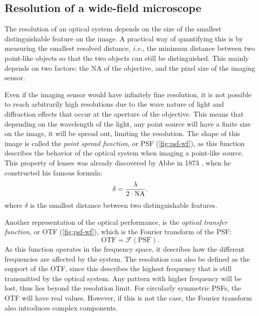   \subsection{Resolution of a wide-field microscope}
    \label{sec:resolution}
    The resolution of an optical system depends on the size of the smallest distinguishable feature on the image. A practical way of quantifying this is by measuring the smallest resolved distance, \textit{i.e.}, the minimum distance between two point-like objects so that the two objects can still be distinguished. This mainly depends on two factors: the NA of the objective, and the pixel size of the imaging sensor.

    Even if the imaging sensor would have infinitely fine resolution, it is not possible to reach arbitrarily high resolutions due to the wave nature of light and diffraction effects that occur at the aperture of the objective. This means that depending on the wavelength of the light, any point source will have a finite size on the image, it will be spread out, limiting the resolution. The shape of this image is called the \textit{point spread function}, or PSF (\autoref{fig:psf-wf}), as this function describes the behavior of the optical system when imaging a point-like source. This property of lenses was already discovered by Abbe in 1873 \cite{abbe_beitrage_1873}, when he constructed his famous formula:
    \begin{equation}
      \delta = \frac{\lambda}{2 \cdot \operatorname{NA}}.
      \label{eq:abbe}
    \end{equation}
    where $\delta$ is the smallest distance between two distinguishable features.

    Another representation of the optical performance, is the \textit{optical transfer function}, or OTF (\autoref{fig:psf-wf}), which is the Fourier transform of the PSF:
    \begin{equation}
      \text{OTF} = \mathcal{F}(\text{PSF}).
    \end{equation}
    As this function operates in the frequency space, it describes how the different frequencies are affected by the system. The resolution can also be defined as the support of the OTF, since this describes the highest frequency that is still transmitted by the optical system. Any pattern with higher frequency will be lost, thus lies beyond the resolution limit. For circularly symmetric PSFs, the OTF will have real values. However, if this is not the case, the Fourier transform also introduces complex components.

